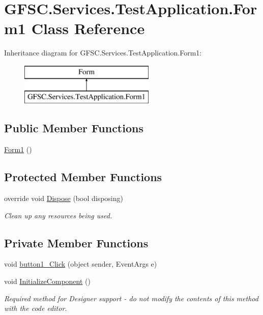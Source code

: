 \hypertarget{class_g_f_s_c_1_1_services_1_1_test_application_1_1_form1}{}\section{G\+F\+S\+C.\+Services.\+Test\+Application.\+Form1 Class Reference}
\label{class_g_f_s_c_1_1_services_1_1_test_application_1_1_form1}
Inheritance diagram for G\+F\+S\+C.\+Services.\+Test\+Application.\+Form1\+:\begin{figure}[H]
\begin{center}
\leavevmode
\includegraphics[height=2.000000cm]{class_g_f_s_c_1_1_services_1_1_test_application_1_1_form1}
\end{center}
\end{figure}
\subsection*{Public Member Functions}
\begin{DoxyCompactItemize}
\item 
\mbox{\hyperlink{class_g_f_s_c_1_1_services_1_1_test_application_1_1_form1_a09334d1ea6e59eb50fe44c27d8746353}{Form1}} ()
\end{DoxyCompactItemize}
\subsection*{Protected Member Functions}
\begin{DoxyCompactItemize}
\item 
override void \mbox{\hyperlink{class_g_f_s_c_1_1_services_1_1_test_application_1_1_form1_a62ccace25f4881305686b4251366eb1c}{Dispose}} (bool disposing)
\begin{DoxyCompactList}\small\item\em Clean up any resources being used. \end{DoxyCompactList}\end{DoxyCompactItemize}
\subsection*{Private Member Functions}
\begin{DoxyCompactItemize}
\item 
void \mbox{\hyperlink{class_g_f_s_c_1_1_services_1_1_test_application_1_1_form1_ae7d7373f18a3b2f84dacea7849ff3d90}{button1\+\_\+\+Click}} (object sender, Event\+Args e)
\item 
void \mbox{\hyperlink{class_g_f_s_c_1_1_services_1_1_test_application_1_1_form1_ab51b4e5cb985f3873b677ceb20c19e63}{Initialize\+Component}} ()
\begin{DoxyCompactList}\small\item\em Required method for Designer support -\/ do not modify the contents of this method with the code editor. \end{DoxyCompactList}\end{DoxyCompactItemize}
